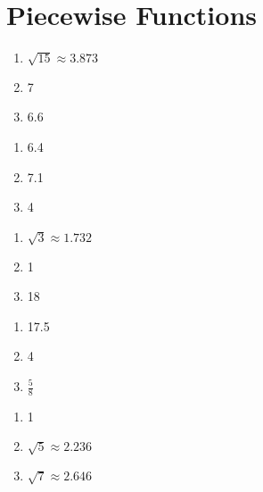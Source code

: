 \section*{Piecewise Functions}
\begin{multicols}{3}
\begin{enumerate}
    \item $\sqrt{15} \approx 3.873$
    \item 7
    \item 6.6
\end{enumerate}	\setcounter{Review}{\value{enumi}}
\end{multicols}
\begin{multicols}{3}
\begin{enumerate}	\setcounter{enumi}{\value{Review}}
    \item 6.4
    \item 7.1
	\item 4
\end{enumerate}	\setcounter{Review}{\value{enumi}}
\end{multicols}
\begin{multicols}{3}
\begin{enumerate}	\setcounter{enumi}{\value{Review}}
    \item $\sqrt{3} \approx 1.732$
    \item 1
    \item 18
\end{enumerate}	\setcounter{Review}{\value{enumi}}
\end{multicols}
\begin{multicols}{3}
\begin{enumerate}	\setcounter{enumi}{\value{Review}}
    \item 17.5
    \item 4
    \item $\frac{5}{8}$
\end{enumerate}	\setcounter{Review}{\value{enumi}}
\end{multicols}
\begin{multicols}{3}
\begin{enumerate}	\setcounter{enumi}{\value{Review}}
    \item 1
    \item $\sqrt{5} \approx 2.236$
    \item $\sqrt{7} \approx 2.646$
\end{enumerate}
\end{multicols}
